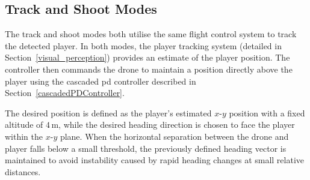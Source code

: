 \documentclass{report_template_oxford}
\begin{document}

\subsection{Track and Shoot Modes}
The track and shoot modes both utilise the same flight control system to track the detected player. In both modes, the player tracking system (detailed in Section~\ref{visual_perception}) provides an estimate of the player position. The controller then commands the drone to maintain a position directly above the player using the cascaded \gls{pd} controller described in Section~\ref{cascadedPDController}. 

The desired position is defined as the player's estimated $x$-$y$ position with a fixed altitude of $4\,\mathrm{m}$, while the desired heading direction is chosen to face the player within the $x$-$y$ plane. When the horizontal separation between the drone and player falls below a small threshold, the previously defined heading vector is maintained to avoid instability caused by rapid heading changes at small relative distances.
\end{document}
